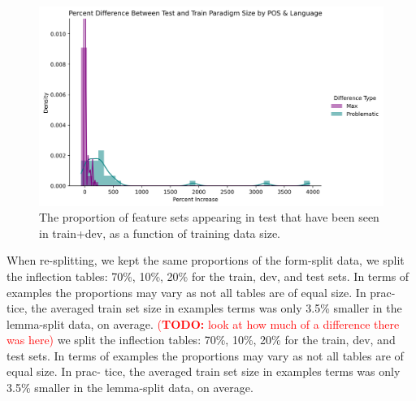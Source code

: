 \documentclass[11pt]{article}
\newcommand{\todo}[1]{\textcolor{red}{(\textbf{TODO:} #1)}}
\begin{document}
\begin{figure}
\centering
\includegraphics[width=\linewidth]{figs/percent_increase.png}
\caption{The proportion of feature sets appearing in test that have been seen in train+dev, as a function of training data size.}
\label{feats_attested}
\end{figure}

When re-splitting, we kept the same proportions of the form-split data, we split the inflection tables: 70\%, 10\%, 20\% for the train, dev, and test sets. 
In terms of examples the proportions may vary as not all tables are of equal size. In prac- tice, the averaged train set size in examples terms was only 3.5\% smaller in the lemma-split data, on average.
\todo{look at how much of a difference there was here}
we split the inflection tables: 70\%, 10\%, 20\% for the train, dev, and test sets. 
In terms of examples the proportions may vary as not all tables are of equal size. In prac- tice, the averaged train set size in examples terms was only 3.5\% smaller in the lemma-split data, on average.

\newpage







%

%
%
\end{document}
